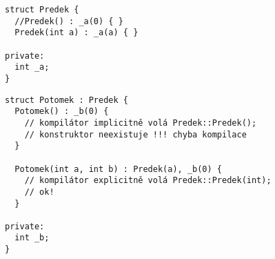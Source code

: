 \begin{frame}[fragile]
\begin{yesblock}
\begin{lstlisting}[basicstyle=\scriptsize]
struct Predek {
  //Predek() : _a(0) { }
  Predek(int a) : _a(a) { }

private:
  int _a;
}
\end{lstlisting}
\end{yesblock}
\begin{noblock}
\begin{lstlisting}[basicstyle=\scriptsize]
struct Potomek : Predek {
  Potomek() : _b(0) {
    // kompilátor implicitně volá Predek::Predek();
    // konstruktor neexistuje !!! chyba kompilace
  }

  Potomek(int a, int b) : Predek(a), _b(0) {
    // kompilátor explicitně volá Predek::Predek(int);
    // ok!
  }

private:
  int _b;
}
\end{lstlisting}
\end{noblock}
\end{frame}




